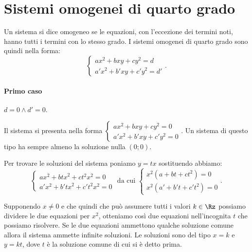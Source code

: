 
\section{Sistemi omogenei di quarto grado}
Un sistema si dice omogeneo se le equazioni, con l'eccezione dei termini noti, 
hanno tutti i termini con lo stesso grado. I sistemi omogenei di quarto grado 
sono quindi nella forma:
\begin{equation*}
\left\{\begin{array}
         {l}{{ax}^2+{bxy}+{cy}^2=d}\\{a'x^2+b'{xy}+c'y^2=d'}
       \end{array}\right..
\end{equation*}
\paragraph{Primo caso} \(d=0 \wedge d'=0\).

Il sistema si presenta nella forma 
\(\left\{\begin{array}{l}{{ax}^2+{bxy}+{cy}^2=0}\\{a'x^2+b'{xy}+c'y^2=0}
         
         \end{array}
         \right.\). 
Un sistema di questo tipo ha sempre almeno la soluzione nulla \( (0; 0) \).

Per trovare le soluzioni del sistema poniamo \(y={tx}\) sostituendo abbiamo: \[ 
\left\{\begin{array}{l}{{ax}^2+{btx}^2+{ct}^2x^2=0}\\{a'x^2+b'{tx}^2+c't^2x^2=0}
\end{array}\right. \text{ da cui } 
\left\{\begin{array}{l}{x^2(a+{bt}+{ct}^2)=0}\\{x^2(a'+b't+c't^2)=0}
       \end{array}\right.. \]

Supponendo \(x\neq 0\) e che quindi che può assumere tutti i valori 
\(k \in \Rz\) possiamo dividere le due equazioni per \(x^2\), otteniamo 
così due equazioni nell'incognita \(t\) che possiamo risolvere. 
Se le due equazioni ammettono qualche soluzione comune allora il sistema 
ammette infinite soluzioni. 
Le soluzioni sono del tipo \(x=k\) e \(y={kt}\), dove \(t\) 
è la soluzione comune di cui si è detto prima.

